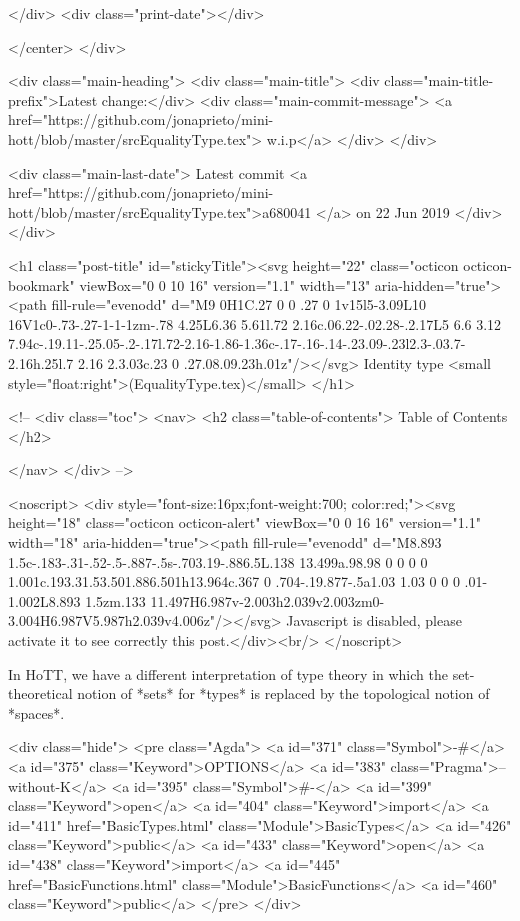           
        </div>
        <div class="print-date"></div>
        
        
    </center>
  </div>

  
  <div class="main-heading">
    <div class="main-title">
      <div class="main-title-prefix">Latest change:</div>
      <div class="main-commit-message">
            <a href="https://github.com/jonaprieto/mini-hott/blob/master/srcEqualityType.tex">
              w.i.p</a>
      </div>
    </div>

    <div class="main-last-date">
      Latest commit <a href="https://github.com/jonaprieto/mini-hott/blob/master/srcEqualityType.tex">a680041 </a> on  22 Jun 2019
    </div>
  </div>
  

  <h1 class="post-title" id="stickyTitle"><svg height="22" class="octicon octicon-bookmark" viewBox="0 0 10 16" version="1.1" width="13" aria-hidden="true"><path fill-rule="evenodd" d="M9 0H1C.27 0 0 .27 0 1v15l5-3.09L10 16V1c0-.73-.27-1-1-1zm-.78 4.25L6.36 5.61l.72 2.16c.06.22-.02.28-.2.17L5 6.6 3.12 7.94c-.19.11-.25.05-.2-.17l.72-2.16-1.86-1.36c-.17-.16-.14-.23.09-.23l2.3-.03.7-2.16h.25l.7 2.16 2.3.03c.23 0 .27.08.09.23h.01z"/></svg> Identity type <small style="float:right">(EqualityType.tex)</small>
  </h1>

  <!-- 
  <div class="toc">
    <nav>
    <h2 class="table-of-contents"> Table of Contents </h2>
      

    </nav>
  </div>
   -->

  <noscript>
  <div style="font-size:16px;font-weight:700; color:red;"><svg height="18" class="octicon octicon-alert" viewBox="0 0 16 16" version="1.1" width="18" aria-hidden="true"><path fill-rule="evenodd" d="M8.893 1.5c-.183-.31-.52-.5-.887-.5s-.703.19-.886.5L.138 13.499a.98.98 0 0 0 0 1.001c.193.31.53.501.886.501h13.964c.367 0 .704-.19.877-.5a1.03 1.03 0 0 0 .01-1.002L8.893 1.5zm.133 11.497H6.987v-2.003h2.039v2.003zm0-3.004H6.987V5.987h2.039v4.006z"/></svg> Javascript is disabled, please activate it to see correctly this post.</div><br/>
  </noscript>

  In HoTT, we have a different interpretation of type theory in which the
set-theoretical notion of *sets* for *types* is replaced by the topological
notion of *spaces*.

<div class="hide">
<pre class="Agda">
<a id="371" class="Symbol">{-#</a> <a id="375" class="Keyword">OPTIONS</a> <a id="383" class="Pragma">--without-K</a> <a id="395" class="Symbol">#-}</a>
<a id="399" class="Keyword">open</a> <a id="404" class="Keyword">import</a> <a id="411" href="BasicTypes.html" class="Module">BasicTypes</a>     <a id="426" class="Keyword">public</a>
<a id="433" class="Keyword">open</a> <a id="438" class="Keyword">import</a> <a id="445" href="BasicFunctions.html" class="Module">BasicFunctions</a> <a id="460" class="Keyword">public</a>
</pre>
</div>

